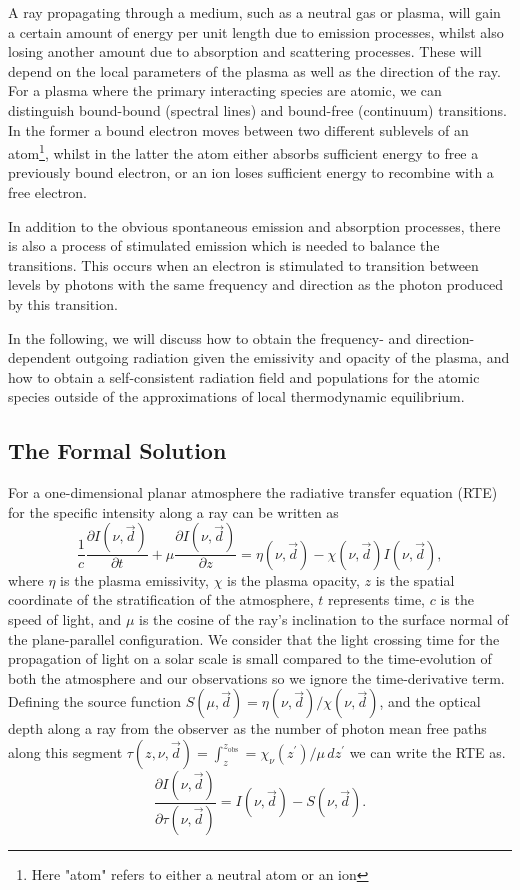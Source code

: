 A ray propagating through a medium, such as a neutral gas or plasma, will gain a certain amount of energy per unit length due to emission processes, whilst also losing another amount due to absorption and scattering processes. These will depend on the local parameters of the plasma as well as the direction of the ray. For a plasma where the primary interacting species are atomic, we can distinguish bound-bound (spectral lines) and bound-free (continuum) transitions. In the former a bound electron moves between two different sublevels of an atom\footnote{Here "atom" refers to either a neutral atom or an ion}, whilst in the latter the atom either absorbs sufficient energy to free a previously bound electron, or an ion loses sufficient energy to recombine with a free electron.

In addition to the obvious spontaneous emission and absorption processes, there is also a process of stimulated emission which is needed to balance the transitions. This occurs when an electron is stimulated to transition between levels by photons with the same frequency and direction as the photon produced by this transition.

In the following, we will discuss how to obtain the frequency- and direction-dependent outgoing radiation given the emissivity and opacity of the plasma, and how to obtain a self-consistent radiation field and populations for the atomic species outside of the approximations of local thermodynamic equilibrium.

\subsection{The Formal Solution}

For a one-dimensional planar atmosphere the radiative transfer equation (RTE) for the specific intensity along a ray can be written as
\begin{equation}
    \frac{1}{c}\frac{\partial I(\nu, \vec{d})}{\partial t} + \mu \frac{\partial I(\nu, \vec{d})}{\partial z} = \eta(\nu, \vec{d}) - \chi(\nu, \vec{d})I(\nu, \vec{d}),
    \label{Eq:FullTimeDepRte}
\end{equation}
where $\eta$ is the plasma emissivity, $\chi$ is the plasma opacity, $z$ is the spatial coordinate of the stratification of the atmosphere, $t$ represents time, $c$ is the speed of light, and $\mu$ is the cosine of the ray's inclination to the surface normal of the plane-parallel configuration.
We consider that the light crossing time for the propagation of light on a solar scale is small compared to the time-evolution of both the atmosphere and our observations so we ignore the time-derivative term.
Defining the source function $S(\mu, \vec{d}) = \eta(\nu, \vec{d}) / \chi(\nu, \vec{d})$, and the optical depth along a ray from the observer as the number of photon mean free paths along this segment $\tau(z, \nu, \vec{d}) = \int_z^{z_{\mathrm{obs}}} = \chi_\nu(z^\prime) / \mu\, dz^\prime$ we can write the RTE as.
\begin{equation}
    \frac{\partial I(\nu, \vec{d})}{\partial \tau(\nu, \vec{d})} = I(\nu, \vec{d}) - S(\nu, \vec{d}).
    \label{Eq:1DRte}
\end{equation}

